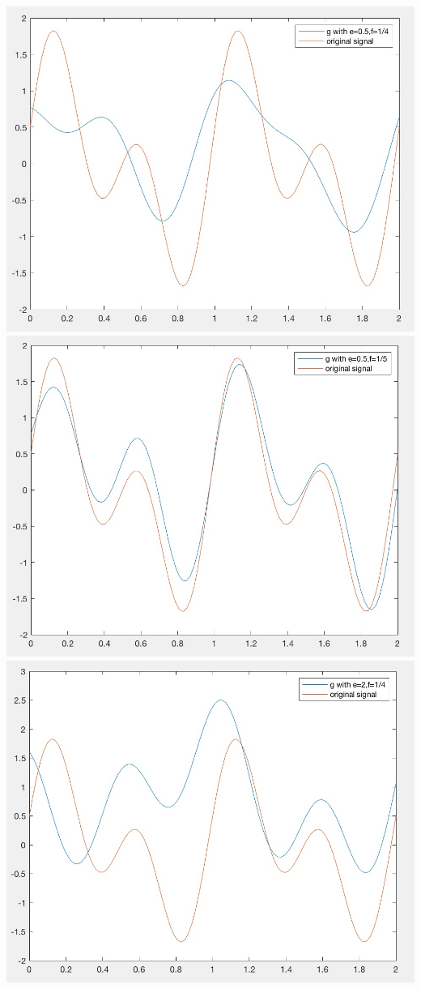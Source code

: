 \documentclass[12pt]{article}
\begin{document}
\begin{enumerate}[a)]
\begin{centering}
        \includegraphics[scale = 0.3]{figures/e05-f14}\\
        \includegraphics[scale = 0.3]{figures/e05-f15}\\
        \includegraphics[scale = 0.3]{figures/e20-f14}\\

\end{centering}
\end{enumerate}
\end{document}
